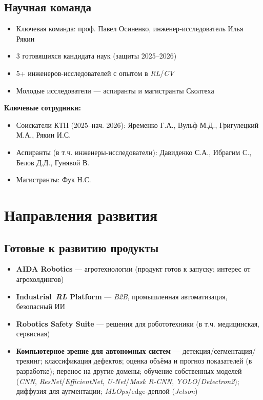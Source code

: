 \documentclass[12pt,a4paper]{article}
\begin{document}
\subsection*{Научная команда}
\begin{itemize}
    \item Ключевая команда: проф. Павел Осиненко, инженер‑исследователь Илья Рякин
    \item 3 готовящихся кандидата наук (защиты 2025–2026)
    \item 5+ инженеров‑исследователей с опытом в \textit{RL}/\textit{CV}
    \item Молодые исследователи — аспиранты и магистранты Сколтеха
\end{itemize}
\textbf{Ключевые сотрудники:}
\begin{itemize}
    \item Соискатели КТН (2025–нач. 2026): Яременко Г.А., Вульф М.Д., Григулецкий М.А., Рякин И.С.
    \item Аспиранты (в т.ч. инженеры-исследователи): Давиденко С.А., Ибрагим С., Белов Д.Д., Гунявой В.
    \item Магистранты: Фук Н.С.
\end{itemize}

\section{Направления развития}
\subsection*{Готовые к развитию продукты}
\begin{itemize}
    \item \textbf{AIDA Robotics} --- агротехнологии (продукт готов к запуску; интерес от агрохолдингов)
    \item \textbf{Industrial~\textit{RL} Platform} --- \textit{B2B}, промышленная автоматизация, безопасный ИИ
    \item \textbf{Robotics Safety Suite} --- решения для робототехники (в т.ч. медицинская, сервисная)
    \item \textbf{Компьютерное зрение для автономных систем} --- детекция/сегментация/трекинг; классификация дефектов; оценка объёма и прогноз показателей (в разработке); перенос на другие домены; обучение собственных моделей (\textit{CNN}, \textit{ResNet}/\textit{EfficientNet}, \textit{U-Net}/\textit{Mask R-CNN}, \textit{YOLO}/\textit{Detectron2}); диффузия для аугментации; \textit{MLOps}/edge-деплой (\textit{Jetson})
\end{itemize}
\end{document}
